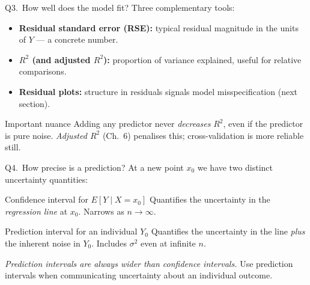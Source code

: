 \documentclass[aspectratio=169,11pt]{beamer}
\begin{document}
\begin{frame}{Q3.\ How well does the model fit?}
  Three complementary tools:
  \begin{itemize}
    \item \textbf{Residual standard error (RSE):} typical residual
          magnitude in the units of $Y$ --- a concrete number.
    \item \textbf{$R^2$ (and adjusted $R^2$):} proportion of variance
          explained, useful for relative comparisons.
    \item \textbf{Residual plots:} structure in residuals signals model
          misspecification (next section).
  \end{itemize}
  \begin{alertblock}{Important nuance}
    Adding any predictor never \emph{decreases} $R^2$, even if the
    predictor is pure noise. \emph{Adjusted $R^2$} (Ch.~6) penalises
    this; cross-validation is more reliable still.
  \end{alertblock}
\end{frame}

\begin{frame}{Q4.\ How precise is a prediction?}
  At a new point $x_0$ we have two distinct uncertainty quantities:
  \begin{block}{Confidence interval for $E[Y \mid X = x_0]$}
    Quantifies the uncertainty in the \emph{regression line} at $x_0$.
    Narrows as $n \to \infty$.
  \end{block}
  \begin{block}{Prediction interval for an individual $Y_0$}
    Quantifies the uncertainty in the line \emph{plus} the inherent
    noise in $Y_0$. Includes $\sigma^2$ even at infinite $n$.
  \end{block}
  \begin{takeaway}
    \emph{Prediction intervals are always wider than confidence
    intervals.} Use prediction intervals when communicating
    uncertainty about an individual outcome.
  \end{takeaway}
\end{frame}
\end{document}
